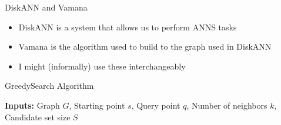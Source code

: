 \begin{frame}{DiskANN and Vamana}
    \begin{itemize}
        \item DiskANN is a system that allows us to perform ANNS tasks
        \item Vamana is the algorithm used to build to the graph used in DiskANN
        \item I might (informally) use these interchangeably
    \end{itemize}
\end{frame}

\begin{frame}
\begin{algorithm}[H]
    \caption{GreedySearch Algorithm}\label{alg:greedy-search}
    \begin{algorithmic}[1]
                \EndIf
            \EndWhile
        \EndFunction
    \end{algorithmic}
\end{algorithm}

\textbf{Inputs:} Graph \(G\), Starting point \(s\), Query point \(q\), Number of neighbors \(k\), Candidate set size \(S\)
\end{frame}

